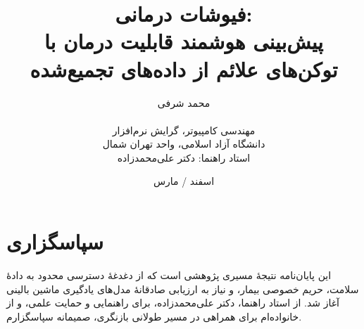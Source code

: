 \renewcommand{\bibname}{مراجع}
\makeatletter
{}%
%
\makeatother

\newenvironment{acknowledgments}
  {\chapter*{سپاسگزاری}}
  {\par\medskip\cleardoublepage}

\pagestyle{fancy}
\fancyhf{}
\fancyhead[LE,RO]{\thepage}
\fancyhead[RE]{\nouppercase{\leftmark}}
\fancyhead[LO]{\nouppercase{\rightmark}}

\title{فیوشات درمانی:\\
پیش‌بینی هوشمند قابلیت درمان با توکن‌های علائم از داده‌های تجمیع‌شده}
\author{محمد شرفی \\[0.35em]
{\normalsize {}} \\[0.65em]
\normalsize مهندسی کامپیوتر، گرایش نرم‌افزار \\
\normalsize دانشگاه آزاد اسلامی، واحد تهران شمال \\[0.5em]
\normalsize استاد راهنما: دکتر علی‌محمدزاده}
\date{اسفند  / مارس }






\cleardoublepage
\ThesisPrelimNumberingStart

\begin{acknowledgments}
این پایان‌نامه نتیجۀ مسیری پژوهشی است که از دغدغۀ دسترسی محدود به دادۀ سلامت، حریم خصوصی بیمار، و نیاز به ارزیابی صادقانۀ مدل‌های یادگیری ماشین بالینی آغاز شد. از استاد راهنما، دکتر علی‌محمدزاده، برای راهنمایی و حمایت علمی، و از خانواده‌ام برای همراهی در مسیر طولانی بازنگری، صمیمانه سپاسگزارم.
\end{acknowledgments}

\tableofcontents
\listoftables
\listoffigures



